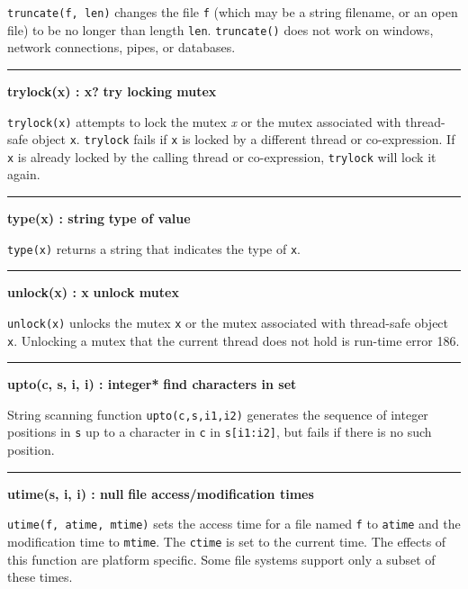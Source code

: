 \noindent
{}\texttt{truncate(f, len)} changes the file
\texttt{f} (which may be a string filename, or an open file) to be no
longer than length \texttt{len}. \texttt{truncate()} does not work on
windows, network connections, pipes, or databases.

\bigskip\hrule\vspace{0.1cm}
\noindent
{\bf trylock(x) : x? } \hfill {\bf try locking mutex}

\noindent
{}\texttt{trylock(x)} attempts to lock the mutex {\textit x} or the
mutex associated with thread-safe object \texttt{x}. \texttt{trylock} fails
if \texttt{x} is locked by a different thread or co-expression. If \texttt{x}
is already locked by the calling thread or co-expression, \texttt{trylock}
will lock it again.

\bigskip\hrule\vspace{0.1cm}
\noindent
{\bf type(x) : string } \hfill {\bf type of value}

\noindent
{}\texttt{type(x)} returns a string that indicates the type
of \texttt{x}.

\bigskip\hrule\vspace{0.1cm}
\noindent
{\bf unlock(x) : x } \hfill {\bf unlock mutex}

\noindent
{}\texttt{unlock(x)} unlocks the mutex \texttt{x} or the mutex
associated with thread-safe object \texttt{x}. Unlocking a mutex that the
current thread does not hold is run-time error 186.

\bigskip\hrule\vspace{0.1cm}
\noindent
{\bf upto(c, s, i, i) : integer* } \hfill {\bf find characters in set}

\noindent
String scanning function \texttt{upto(c,s,i1,i2)}
generates the sequence of integer positions in \texttt{s} up to a
character in \texttt{c} in \texttt{s[i1:i2]}, but fails if there is no
such position.

\bigskip\hrule\vspace{0.1cm}
\noindent
{\bf utime(s, i, i) : null } \hfill {\bf file access/modification times}

\noindent
\texttt{utime(f, atime, mtime)} sets the access
time for a file named \texttt{f} to \texttt{atime} and the modification
time to \texttt{mtime}. The \texttt{ctime} is set to the current time.
The effects of this function are platform specific. Some file systems
support only a subset of these times.

